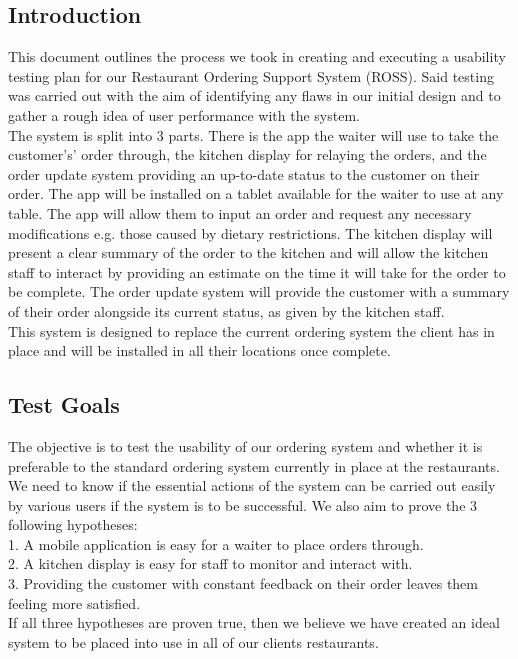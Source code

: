 \documentclass[11pt, a4paper]{report}
\begin{document}
\subsection{Introduction} 
This   document   outlines   the   process   we   took   in   creating   and   executing   a   usability testing   plan   for   our   Restaurant   Ordering   Support   System   (ROSS).   Said   testing   was carried   out   with   the   aim   of   identifying   any   flaws   in   our   initial   design   and   to   gather   a rough   idea   of   user   performance   with   the   system.\\
The   system   is   split   into   3   parts.   There   is   the   app   the   waiter   will   use   to   take   the customer's’   order   through,   the   kitchen   display   for   relaying   the   orders,   and   the   order update   system   providing   an   up-to-date   status   to   the   customer   on   their   order.   The app   will   be   installed   on   a   tablet   available   for   the   waiter   to   use   at   any   table.   The   app will   allow   them   to   input   an   order   and   request   any   necessary   modifications   e.g. those   caused   by   dietary   restrictions.   The   kitchen   display   will   present   a   clear summary   of   the   order   to   the   kitchen   and   will   allow   the   kitchen   staff   to   interact   by providing   an   estimate   on   the   time   it   will   take   for   the   order   to   be   complete.   The order   update   system   will   provide   the   customer   with   a   summary   of   their   order alongside   its   current   status,   as   given   by   the   kitchen   staff.\\
This   system   is   designed   to   replace   the   current   ordering   system   the   client   has   in place   and   will   be   installed   in   all   their   locations   once   complete.\\
\subsection{Test Goals} 
The   objective   is   to   test   the   usability   of   our   ordering   system   and   whether   it   is preferable   to   the   standard   ordering   system   currently   in   place   at   the   restaurants.   We need   to   know   if   the   essential   actions   of   the   system   can   be   carried   out   easily   by various   users   if   the   system   is   to   be   successful.   We   also   aim   to   prove   the   3   following hypotheses:\\
1. A   mobile   application   is   easy   for   a   waiter   to   place   orders   through.\\
2. A   kitchen   display   is   easy   for   staff   to   monitor   and   interact   with.\\
3. Providing   the   customer   with   constant   feedback   on   their   order   leaves   them
feeling   more   satisfied.\\
If   all   three   hypotheses   are   proven   true,   then   we   believe   we   have   created   an   ideal system   to   be   placed   into   use   in   all   of   our   clients   restaurants.\\
\end{document}
